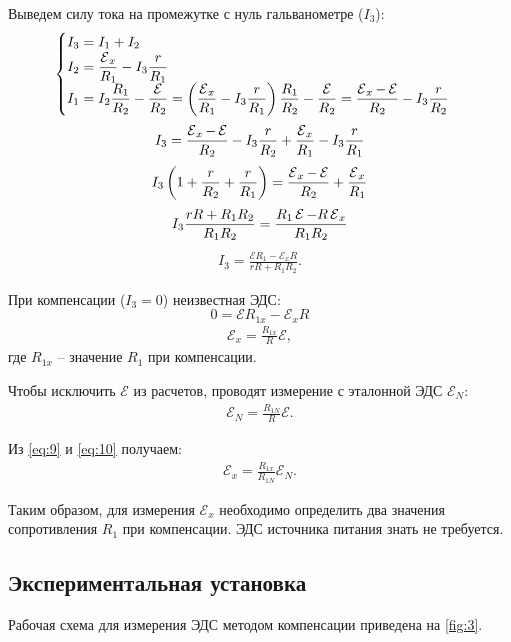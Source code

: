Выведем силу тока на промежутке с нуль гальванометре ($I_3$):
\begin{align}\label{eq:1.2}
	\begin{cases}
		I_3 = I_1 + I_2\\
		I_2 = \dfrac{\operatorname{\mathcal{E}}_x}{R_1} - I_3 \dfrac{r}{R_1}\\
		I_1 = I_2 \dfrac{R_1}{R_2} - \dfrac{\operatorname{\mathcal{E}}}{R_2} = \left(\dfrac{\operatorname{\mathcal{E}}_x}{R_1} - I_3 \dfrac{r}{R_1}\right) \dfrac{R_1}{R_2} - \dfrac{\operatorname{\mathcal{E}}}{R_2} = \dfrac{\operatorname{\mathcal{E}}_x - \operatorname{\mathcal{E}}}{R_2} - I_3 \dfrac{r}{R_2}
	\end{cases}
\end{align}
\[I_3 = \dfrac{\operatorname{\mathcal{E}}_x - \operatorname{\mathcal{E}}}{R_2} - I_3 \dfrac{r}{R_2} + \dfrac{\operatorname{\mathcal{E}}_x}{R_1} - I_3 \dfrac{r}{R_1}\]
\[I_3 \left(1 + \dfrac{r}{R_2} + \dfrac{r}{R_1}\right) = \dfrac{\operatorname{\mathcal{E}}_x - \operatorname{\mathcal{E}}}{R_2} + \dfrac{\operatorname{\mathcal{E}}_x}{R_1}\]
\[I_3 \dfrac{r R + R_1 R_2}{R_1 R_2} = \dfrac{R_1 \operatorname{\mathcal{E}} - R \operatorname{\mathcal{E}}_x}{R_1 R_2}\]
\begin{align} \label{eq:8}
	I_3 = \frac{\mathcal{E} R_1 - \mathcal{E}_x R}{rR + R_1 R_2}.
\end{align}

При компенсации ($I_3 = 0$) неизвестная ЭДС:
\[0 = \mathcal{E} R_{1x} - \mathcal{E}_x R\]
\begin{align} \label{eq:9}
	\mathcal{E}_x = \frac{R_{1x}}{R} \mathcal{E},
\end{align}
где $R_{1x}$ -- значение $R_1$ при компенсации.

Чтобы исключить $\mathcal{E}$ из расчетов, проводят измерение с эталонной ЭДС $\mathcal{E}_N$:
\begin{align} \label{eq:10}
	\mathcal{E}_N = \frac{R_{1N}}{R} \mathcal{E}.
\end{align}

Из \eqref{eq:9} и \eqref{eq:10} получаем:
\begin{align} \label{eq:11}
	\mathcal{E}_x = \frac{R_{1x}}{R_{1N}} \mathcal{E}_N.
\end{align}

Таким образом, для измерения $\mathcal{E}_x$ необходимо определить два значения сопротивления $R_1$ при компенсации. ЭДС источника питания знать не требуется.

\subsection{Экспериментальная установка}
Рабочая схема для измерения ЭДС методом компенсации приведена на \cref{fig:3}.

